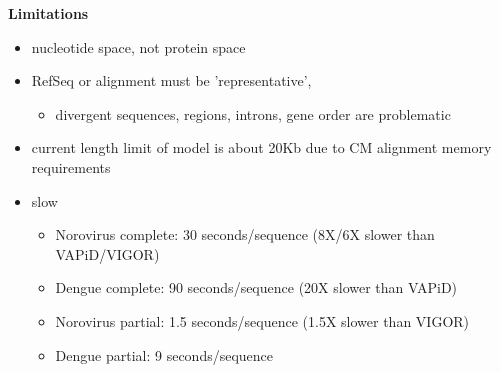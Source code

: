 \documentclass[landscape]{slides}
\begin{document}
\begin{slide}
\begin{center}
\textbf{Limitations}
\end{center}

\small
\begin{itemize}
\item nucleotide space, not protein space
\item RefSeq or alignment must be 'representative',
  \begin{itemize}
    \item divergent sequences, regions, introns, gene order are problematic
  \end{itemize}
\item current length limit of model is about 20Kb due to CM alignment memory
  requirements
\item slow
  \begin{itemize}
  \item Norovirus complete: 30 seconds/sequence (8X/6X slower than
    VAPiD/VIGOR)
  \item Dengue complete: 90 seconds/sequence (20X slower than VAPiD)
  \item Norovirus partial: 1.5 seconds/sequence (1.5X slower than VIGOR)
  \item Dengue partial: 9 seconds/sequence
  \end{itemize}
\end{itemize}

\vfill
\end{slide}
\end{document}
